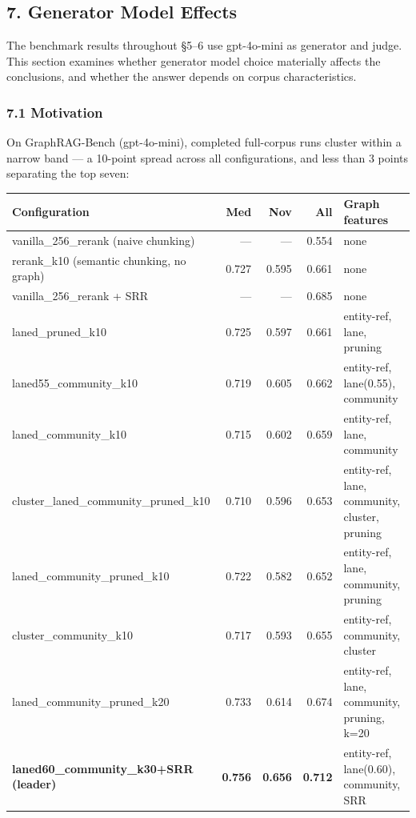 \documentclass[
]{article}
\begin{document}
\subsection{7. Generator Model Effects}\label{generator-model-effects}

The benchmark results throughout §5--6 use gpt-4o-mini as generator and
judge. This section examines whether generator model choice materially
affects the conclusions, and whether the answer depends on corpus
characteristics.

\subsubsection{7.1 Motivation}\label{motivation}

On GraphRAG-Bench (gpt-4o-mini), completed full-corpus runs cluster
within a narrow band --- a 10-point spread across all configurations,
and less than 3 points separating the top seven:

\begin{small}
\setlength{\tabcolsep}{4pt}
\begin{longtable}{p{2.3in}rrrp{1.6in}}
\toprule
\textbf{Configuration} & \textbf{Med} & \textbf{Nov} & \textbf{All} & \textbf{Graph features} \\
\midrule
\endhead
vanilla\_256\_rerank (naive chunking) & — & — & 0.554 & none \\
rerank\_k10 (semantic chunking, no graph) & 0.727 & 0.595 & 0.661 & none \\
vanilla\_256\_rerank + SRR & — & — & 0.685 & none \\
laned\_pruned\_k10 & 0.725 & 0.597 & 0.661 & entity-ref, lane, pruning \\
laned55\_community\_k10 & 0.719 & 0.605 & 0.662 & entity-ref, lane(0.55), community \\
laned\_community\_k10 & 0.715 & 0.602 & 0.659 & entity-ref, lane, community \\
cluster\_laned\_community\_pruned\_k10 & 0.710 & 0.596 & 0.653 & entity-ref, lane, community, cluster, pruning \\
laned\_community\_pruned\_k10 & 0.722 & 0.582 & 0.652 & entity-ref, lane, community, pruning \\
cluster\_community\_k10 & 0.717 & 0.593 & 0.655 & entity-ref, community, cluster \\
laned\_community\_pruned\_k20 & 0.733 & 0.614 & 0.674 & entity-ref, lane, community, pruning, k=20 \\
\textbf{laned60\_community\_k30+SRR (leader)} & \textbf{0.756} & \textbf{0.656} & \textbf{0.712} & entity-ref, lane(0.60), community, SRR \\
\bottomrule
\end{longtable}
\end{small}
\end{document}
